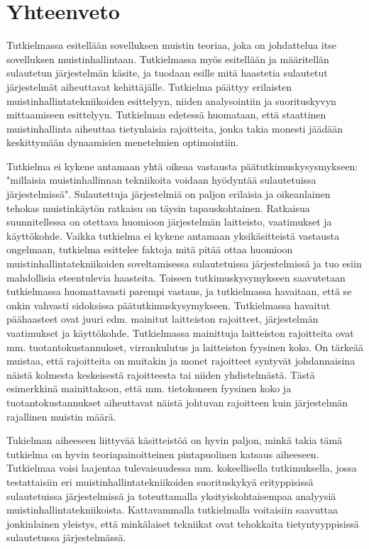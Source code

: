 \chapter{Yhteenveto} \label{Yhteenveto}

Tutkielmassa esitellään sovelluksen muistin teoriaa, joka on johdattelua itse sovelluksen muistinhallintaan. Tutkielmassa myös esitellään ja määritellän sulautetun järjestelmän käsite, ja tuodaan esille mitä haastetia sulautetut järjestelmät aiheuttavat kehittäjälle. Tutkielma päättyy erilaisten muistinhallintatekniikoiden esittelyyn, niiden analysointiin ja suorituskyvyn mittaamiseen esittelyyn. Tutkielman edetessä huomataan, että staattinen muistinhallinta aiheuttaa tietynlaisia rajoitteita, jonka takia monesti jäädään keskittymään dynaamisien menetelmien optimointiin.

Tutkielma ei kykene antamaan yhtä oikeaa vastausta päätutkimuskysysmykseen: "millaisia muistinhallinnan tekniikoita voidaan hyödyntää sulautetuissa järjestelmissä". Sulautettuja järjestelmiä on paljon erilaisia ja oikeanlainen tehokas muistinkäytön ratkaisu on täysin tapauskohtainen. Ratkaisua suunnitellessa on otettava huomioon järjestelmän laitteisto, vaatimukset ja käyttökohde. Vaikka tutkielma ei kykene antamaan yksikäsitteistä vastausta ongelmaan, tutkielma esittelee faktoja mitä pitää ottaa huomioon muistinhallintatekniikoiden soveltamisessa sulautetuissa järjestelmissä ja tuo esiin mahdollisia eteentulevia haasteita. Toiseen tutkimuskysymykseen saavutetaan tutkielmassa huomattavasti parempi vastaus, ja tutkielmassa havaitaan, että se onkin vahvasti sidoksissa päätutkimuskysymykseen. Tutkielmassa havaitut päähaasteet ovat juuri edm. mainitut laitteiston rajoitteet, järjestelmän vaatimukset ja käyttökohde. Tutkielmassa mainittuja laitteiston rajoitteita ovat mm. tuotantokustannukset, virrankulutus ja laitteiston fyysinen koko. On tärkeää muistaa, että rajoitteita on muitakin ja monet rajoitteet syntyvät johdannaisina näistä kolmesta keskeisestä rajoitteesta tai niiden yhdistelmästä. Tästä esimerkkinä mainittakoon, että mm. tietokoneen fyysinen koko ja tuotantokustannukset aiheuttavat näistä johtuvan rajoitteen kuin järjestelmän rajallinen muistin määrä.

Tukielman aiheeseen liittyvää käsitteistöä on hyvin paljon, minkä takia tämä tutkielma on hyvin teoriapainoitteinen pintapuolinen katsaus aiheeseen. Tutkielmaa voisi laajentaa tulevaisuudessa mm. kokeellisella tutkimuksella, jossa testattaisiin eri muistinhallintatekniikoiden suorituskykyä erityppisissä sulautetuissa järjestelmissä ja toteuttamalla yksityiskohtaisempaa analyysiä muistinhallintatekniikoista. Kattavammalla tutkielmalla voitaisiin saavuttaa jonkinlainen yleistys, että minkälaiset tekniikat ovat tehokkaita tietyntyyppisissä sulautetussa järjestelmässä.